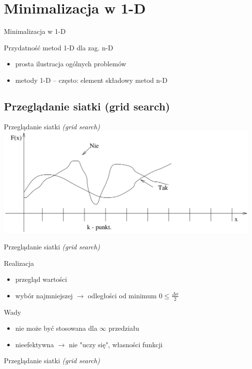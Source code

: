 \section{Minimalizacja w 1-D}
  \begin{frame}{Minimalizacja w 1-D}
    \begin{block}{Przydatność metod 1-D dla zag. n-D}
      \begin{itemize}
        \item prosta ilustracja ogólnych problemów
        \item metody 1-D -- często: element składowy metod n-D

      \end{itemize}

    \end{block}

  \end{frame}

\subsection{Przeglądanie siatki (grid search)}
  \begin{frame}{Przeglądanie siatki \emph{(grid search)}}
    \includegraphics[width=1\textwidth]{img/17/przegladanie_siatki}
  \end{frame}

  \begin{frame}{Przeglądanie siatki \emph{(grid search)}}
    \begin{block}{Realizacja}
      \begin{itemize}
        \item przegląd wartości
        \item wybór najmniejszej $ \to $ odległości od minimum
        $ 0 \leq \frac{\Delta x}{2} $
      \end{itemize}
    \end{block}
    \begin{block}{Wady}
      \begin{itemize}
        \item nie może być stosowana dla $ \infty $ przedziału
        \item nieefektywna $ \to $ nie "uczy się", własności funkcji
      \end{itemize}
    \end{block}
  \end{frame}

  \begin{frame}{Przeglądanie siatki \emph{(grid search)}}
    
  \end{frame}
